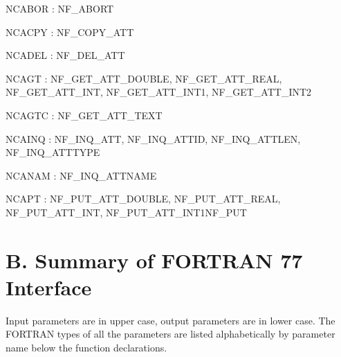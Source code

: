 {\ttfamily N\+C\+A\+B\+OR} \+: N\+F\+\_\+\+A\+B\+O\+RT

{\ttfamily N\+C\+A\+C\+PY} \+: N\+F\+\_\+\+C\+O\+P\+Y\+\_\+\+A\+TT

{\ttfamily N\+C\+A\+D\+EL} \+: N\+F\+\_\+\+D\+E\+L\+\_\+\+A\+TT

{\ttfamily N\+C\+A\+GT} \+: N\+F\+\_\+\+G\+E\+T\+\_\+\+A\+T\+T\+\_\+\+D\+O\+U\+B\+LE, N\+F\+\_\+\+G\+E\+T\+\_\+\+A\+T\+T\+\_\+\+R\+E\+AL, N\+F\+\_\+\+G\+E\+T\+\_\+\+A\+T\+T\+\_\+\+I\+NT, N\+F\+\_\+\+G\+E\+T\+\_\+\+A\+T\+T\+\_\+\+I\+N\+T1, N\+F\+\_\+\+G\+E\+T\+\_\+\+A\+T\+T\+\_\+\+I\+N\+T2

{\ttfamily N\+C\+A\+G\+TC} \+: N\+F\+\_\+\+G\+E\+T\+\_\+\+A\+T\+T\+\_\+\+T\+E\+XT

{\ttfamily N\+C\+A\+I\+NQ} \+: N\+F\+\_\+\+I\+N\+Q\+\_\+\+A\+TT, N\+F\+\_\+\+I\+N\+Q\+\_\+\+A\+T\+T\+ID, N\+F\+\_\+\+I\+N\+Q\+\_\+\+A\+T\+T\+L\+EN, N\+F\+\_\+\+I\+N\+Q\+\_\+\+A\+T\+T\+T\+Y\+PE

{\ttfamily N\+C\+A\+N\+AM} \+: N\+F\+\_\+\+I\+N\+Q\+\_\+\+A\+T\+T\+N\+A\+ME

{\ttfamily N\+C\+A\+PT} \+: N\+F\+\_\+\+P\+U\+T\+\_\+\+A\+T\+T\+\_\+\+D\+O\+U\+B\+LE, N\+F\+\_\+\+P\+U\+T\+\_\+\+A\+T\+T\+\_\+\+R\+E\+AL, N\+F\+\_\+\+P\+U\+T\+\_\+\+A\+T\+T\+\_\+\+I\+NT, N\+F\+\_\+\+P\+U\+T\+\_\+\+A\+T\+T\+\_\+\+I\+N\+T1\+N\+F\+\_\+\+P\+UT\hypertarget{nc_f77_interface_guide_f77_interface_summary}{}\section{B. Summary of F\+O\+R\+T\+R\+A\+N 77 Interface }\label{nc_f77_interface_guide_f77_interface_summary}
Input parameters are in upper case, output parameters are in lower case. The F\+O\+R\+T\+R\+AN types of all the parameters are listed alphabetically by parameter name below the function declarations.

 


